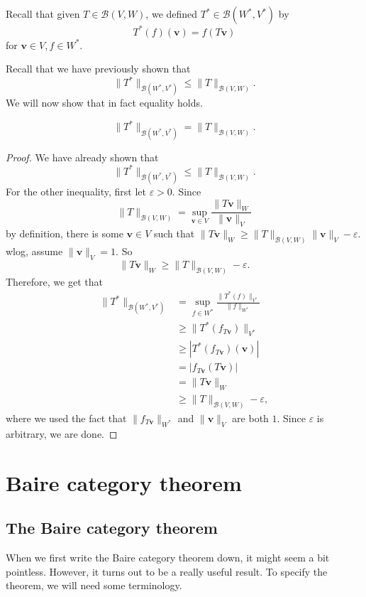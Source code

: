 \documentclass[a4paper]{article}
\begin{document}
Recall that given $T\in \mathcal{B}(V, W)$, we defined $T^*\in \mathcal{B}(W^*, V^*)$ by
\[
  T^*(f)(\mathbf{v}) = f(T\mathbf{v})
\]
for $\mathbf{v}\in V, f\in W^*$.

Recall that we have previously shown that
\[
  \|T^*\|_{\mathcal{B}(W^*, V^*)} \leq \|T\|_{\mathcal{B}(V, W)}.
\]
We will now show that in fact equality holds.
\begin{prop}
  \[
    \|T^*\|_{\mathcal{B}(W^*, V^*)} = \|T\|_{\mathcal{B}(V, W)}.
  \]
\end{prop}

\begin{proof}
  We have already shown that
  \[
    \|T^*\|_{\mathcal{B}(W^*, V^*)} \leq \|T\|_{\mathcal{B}(V, W)}.
  \]
  For the other inequality, first let $\varepsilon > 0$. Since
  \[
    \|T\|_{\mathcal{B}(V, W)} = \sup_{\mathbf{v}\in V} \frac{\|T\mathbf{v}\|_W}{\|\mathbf{v}\|_V}
  \]
  by definition, there is some $\mathbf{v}\in V$ such that $\|T\mathbf{v}\|_W \geq \|T\|_{\mathcal{B}(V, W)}\|\mathbf{v}\|_V - \varepsilon$. wlog, assume $\|\mathbf{v}\|_V = 1$. So
  \[
    \|T\mathbf{v}\|_W \geq \|T\|_{\mathcal{B}(V, W)} - \varepsilon.
  \]
  Therefore, we get that
  \begin{align*}
    \|T^*\|_{\mathcal{B}(W^*, V^*)} &= \sup_{f\in W^*} \frac{\|T^*(f)\|_{V^*}}{\|f\|_{W^*}} \\
    &\geq \|T^*(f_{T\mathbf{v}})\|_{V^*} \\
    &\geq |T^*(f_{T\mathbf{v}})(\mathbf{v})| \\
    &= |f_{T\mathbf{v}}(T\mathbf{v})| \\
    &= \|T\mathbf{v}\|_W \\
    &\geq \|T\|_{\mathcal{B}(V, W)} - \varepsilon,
  \end{align*}
  where we used the fact that $\|f_{T\mathbf{v}}\|_{W^*}$ and $\|\mathbf{v}\|_V$ are both $1$. Since $\varepsilon$ is arbitrary, we are done.
\end{proof}

\section{Baire category theorem}
\subsection{The Baire category theorem}
When we first write the Baire category theorem down, it might seem a bit pointless. However, it turns out to be a really useful result. To specify the theorem, we will need some terminology.
\end{document}
